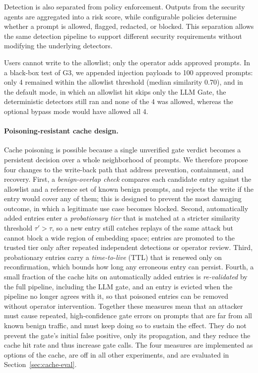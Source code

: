 \documentclass[runningheads]{llncs}
\newif\ifrev
\newcommand{\rev}[1]{\ifrev\hl{#1}\else#1\fi}                  %
\begin{document}
Detection is also separated from policy enforcement. Outputs from the
security agents are aggregated into a risk score, while configurable
policies determine whether a prompt is allowed, flagged, redacted, or
blocked. This separation allows the same detection pipeline to support
different security requirements without modifying the underlying
detectors.

\rev{Users cannot write to the allowlist; only the operator adds approved prompts. In a black-box test of G3, we appended injection payloads to 100 approved prompts: only 4 remained within the allowlist threshold (median similarity 0.70), and in the default mode, in which an allowlist hit skips only the LLM Gate, the deterministic detectors still ran and none of the 4 was allowed, whereas the optional bypass mode would have allowed all 4.}

\paragraph{\protect\rev{Poisoning-resistant cache design.}}
\rev{Cache poisoning is possible because a single unverified gate verdict becomes a persistent decision over a whole neighborhood of prompts. We therefore propose four changes to the write-back path that address prevention, containment, and recovery. First, a \emph{benign-overlap check} compares each candidate entry against the allowlist and a reference set of known benign prompts, and rejects the write if the entry would cover any of them; this is designed to prevent the most damaging outcome, in which a legitimate use case becomes blocked. Second, automatically added entries enter a \emph{probationary tier} that is matched at a stricter similarity threshold $\tau'>\tau$, so a new entry still catches replays of the same attack but cannot block a wide region of embedding space; entries are promoted to the trusted tier only after repeated independent detections or operator review. Third, probationary entries carry a \emph{time-to-live} (TTL) that is renewed only on reconfirmation, which bounds how long any erroneous entry can persist. Fourth, a small fraction of the cache hits on automatically added entries is \emph{re-validated} by the full pipeline, including the LLM gate, and an entry is evicted when the pipeline no longer agrees with it, so that poisoned entries can be removed without operator intervention. Together these measures mean that an attacker must cause repeated, high-confidence gate errors on prompts that are far from all known benign traffic, and must keep doing so to sustain the effect. They do not prevent the gate's initial false positive, only its propagation, and they reduce the cache hit rate and thus increase gate calls. The four measures are implemented as options of the cache, are off in all other experiments, and are evaluated in Section~\ref{sec:cache-eval}.}
\end{document}

